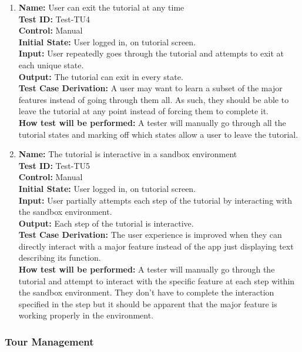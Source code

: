 \documentclass[12pt, titlepage]{article}
\begin{document}
\begin{enumerate}
    \item
    \textbf{Name:} User can exit the tutorial at any time \label{itm:Test-TU4} \\
    \textbf{Test ID:} Test-TU4 \\
    \textbf{Control:} Manual \\
    \textbf{Initial State:} User logged in, on tutorial screen. \\
    \textbf{Input:} User repeatedly goes through the tutorial and attempts to exit at each unique state. \\
    \textbf{Output:} The tutorial can exit in every state. \\
    \textbf{Test Case Derivation:} A user may want to learn a subset of the major features instead of going through them all. As such, they should be able to leave the tutorial at any point instead of forcing them to complete it. \\
    \textbf{How test will be performed:} A tester will manually go through all the tutorial states and marking off which states allow a user to leave the tutorial.
    
    \item
    \textbf{Name:} The tutorial is interactive in a sandbox environment \label{itm:Test-TU5} \\
    \textbf{Test ID:} Test-TU5 \\
    \textbf{Control:} Manual \\
    \textbf{Initial State:} User logged in, on tutorial screen. \\
    \textbf{Input:} User partially attempts each step of the tutorial by interacting with the sandbox environment. \\
    \textbf{Output:} Each step of the tutorial is interactive. \\
    \textbf{Test Case Derivation:} The user experience is improved when they can directly interact with a major feature instead of the app just displaying text describing its function. \\
    \textbf{How test will be performed:} A tester will manually go through the tutorial and attempt to interact with the specific feature at each step within the sandbox environment. They don't have to complete the interaction specified in the step but it should be apparent that the major feature is working properly in the environment.

\end{enumerate}

\subsubsection{Tour Management}
\end{document}
